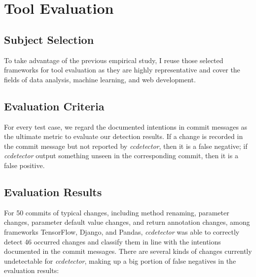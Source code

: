 \chapter{Tool Evaluation}
\label{chap:tool-evaluation}

\section{Subject Selection}

To take advantage of the previous empirical study, I reuse those selected frameworks for tool evaluation as they are highly representative and cover the fields of data analysis, machine learning, and web development.

\section{Evaluation Criteria}

For every test case, we regard the documented intentions in commit messages as the ultimate metric to evaluate our detection results. If a change is recorded in the commit message but not reported by \textit{ccdetector}, then it is a false negative; if \textit{ccdetector} output something unseen in the corresponding commit, then it is a false positive.

\section{Evaluation Results}

For 50 commits of typical changes, including method renaming, parameter changes, parameter default value changes, and return annotation changes, among frameworks TensorFlow, Django, and Pandas, \textit{ccdetector} was able to correctly detect 46 occurred changes and classify them in line with the intentions documented in the commit messages. There are several kinds of changes currently undetectable for \textit{ccdetector}, making up a big portion of false negatives in the evaluation results:


